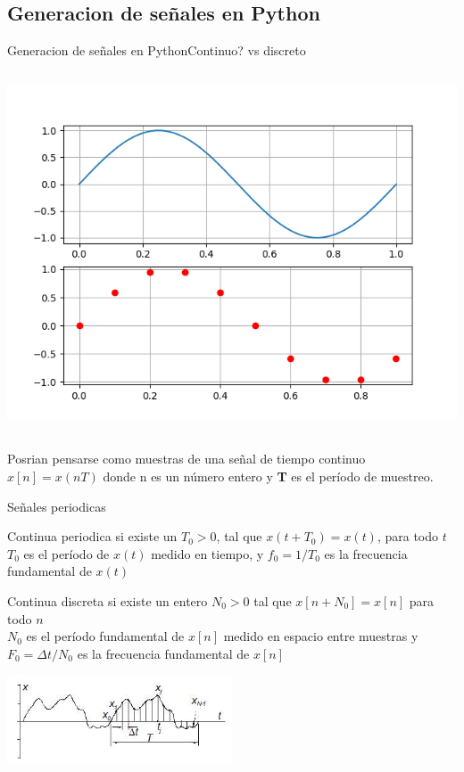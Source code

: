 \begin{darkframes}
    \subsection{Generacion de señales en Python}
    \begin{frame}{Generacion de señales en Python}{Continuo? vs discreto}
      \begin{columns}[onlytextwidth]
      
      \includegraphics[width=\textwidth]{1_clase/python_continuo_vs_discreto}
         \end{columns}
         Posrian pensarse como muestras de una señal de tiempo continuo $x[n] = x (nT)$ donde n es un número entero y \textbf{T} es el período de muestreo.
      \vfill
    \end{frame}
    \begin{frame}{Señales periodicas}
      \begin{block}{Continua periodica}
         si existe un $T_0>0$, tal que $x(t+T_0)=x(t)$, para todo $t$\\
         $T_0$ es el período de $x(t)$ medido en tiempo, y $f_0=1/T_0$ es la frecuencia fundamental de $x(t)$
   \end{block}
      \begin{block}{Continua discreta}
         si existe un entero $N_0>0$ tal que $x[n+N_0]=x[n]$ para
         todo $n$ \\
         $N_0$ es el período fundamental de $x[n]$ medido en espacio entre muestras
         y  $F_0=\Delta t/N_0$ es la frecuencia fundamental de $x[n]$
   \end{block}
      \center\includegraphics[width=0.5\textwidth]{1_clase/periodica}
   \vfill
   \end{frame}

\end{darkframes}
